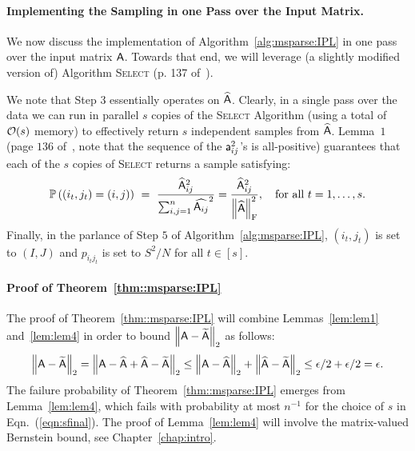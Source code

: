 \paragraph{Implementing the Sampling in one Pass over the Input Matrix.}\label{sxn:onepass}
%
We now discuss the implementation of Algorithm~\ref{alg:msparse:IPL} in one pass over the input matrix ${\mathsf{A} }$. Towards that end, we will leverage (a slightly modified version of) Algorithm \textsc{Select} (p. 137 of~\cite{matrixmult:drineas}).
%
%
\noindent We note that Step $3$ essentially operates on $\widehat{{\mathsf{A} }}$. Clearly, in a single pass over the data we can run in parallel $s$ copies of the \textsc{Select} Algorithm (using a total of $\mathcal{O}(s)$ memory) to effectively return $s$ independent samples from $\widehat{{\mathsf{A} }}$. Lemma~$1$ (page $136$ of~\cite{matrixmult:drineas}, note that the sequence of the ${\mathsf{a} }_{ij}^2$'s is all-positive) guarantees that each of the $s$ copies of \textsc{Select} returns a sample satisfying:
%
\[\Prob{ (i_t,j_t) = (i, j) }\ =\ \frac{\widehat{\matA}_{ij}^2}{\sum_{i,j=1}^n \widehat{\matA_{ij}}^2} = \frac{\widehat{\matA}_{ij}^2}{\frobnorm{\widehat{\matA}}^2},\quad \mbox{for all }t=1,\dots ,s.\]
%
Finally, in the parlance of Step $5$ of Algorithm~\ref{alg:msparse:IPL}, $(i_t, j_t)$ is set to $(I,J)$ and $p_{i_tj_t}$ is set to $S^2/N$ for all $t \in [s]$.
%
\paragraph{Proof of Theorem~\ref{thm::msparse:IPL}}
%
The proof of Theorem~\ref{thm::msparse:IPL} will combine Lemmas~\ref{lem:lem1} and~\ref{lem:lem4} in order to bound $\left\|{\mathsf{A} } - \widetilde{{\mathsf{A} }}\right\|_2$ as follows:
%
\begin{align*}
	\left\|{\mathsf{A} }-\widetilde{{\mathsf{A} }}\right\|_2 = \left\|{\mathsf{A} }-\widehat{{\mathsf{A} }} + \widehat{{\mathsf{A} }} - \widetilde{{\mathsf{A} }}\right\|_2 \leq \left\|{\mathsf{A} }-\widehat{{\mathsf{A} }}\right\|_2 + \left\|\widehat{{\mathsf{A} }} - \widetilde{{\mathsf{A} }}\right\|_2 \leq \epsilon/2+\epsilon/2 = \epsilon.
\end{align*}
%
The failure probability of Theorem~\ref{thm::msparse:IPL} emerges from Lemma~\ref{lem:lem4}, which fails with probability at most $n^{-1}$ for the choice of $s$ in Eqn.~(\ref{eqn:sfinal}). The proof of Lemma~\ref{lem:lem4} will involve the matrix-valued Bernstein bound, see Chapter~\ref{chap:intro}.
%
